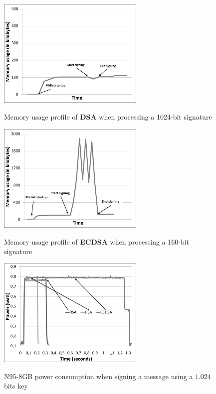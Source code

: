 \documentclass[authoryear]{elsarticle}
\begin{document}
\begin{figure}[ht]
\begin{center}
  \includegraphics[width=7cm]{immagini/MemoryDSA.pdf}\\
  \caption{Memory usage profile of \textbf{DSA} when processing a 1024-bit signature}
  \label{fig:MemoryDSA}
\end{center}
\end{figure}

\begin{figure}[ht]
\begin{center}
  \includegraphics[width=7cm]{immagini/MemoryECDSA.pdf}\\
  \caption{Memory usage profile of \textbf{ECDSA} when processing a 160-bit signature}
  \label{fig:MemoryECDSA}
\end{center}
\end{figure}

\begin{figure}[ht]
\begin{center}
  \includegraphics[width=7cm]{immagini/Power.pdf}\\
  \caption{N95-8GB power consumption when signing a message using a $1.024$ bits key}
  \label{fig:N95Power}
\end{center}
\end{figure}
\end{document}

